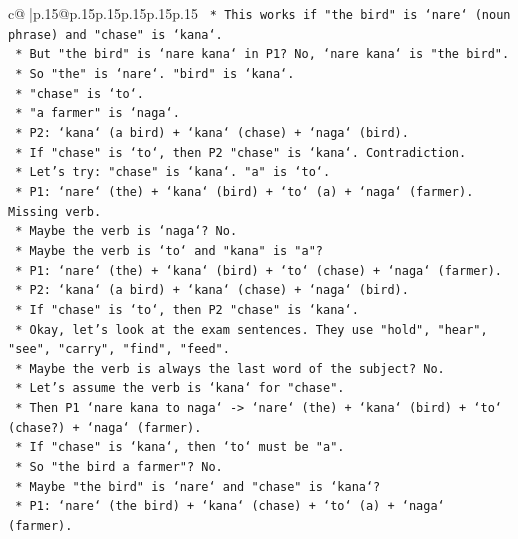 \documentclass{article}
\begin{document}
{\begin{supertabular}{c@{$\;$}|p{.15\linewidth}@{}p{.15\linewidth}p{.15\linewidth}p{.15\linewidth}p{.15\linewidth}p{.15\linewidth}}
{{{\texttt{            *   This works if "the bird" is `nare` (noun phrase) and "chase" is `kana`.} \\
\texttt{            *   But "the bird" is `nare kana` in P1? No, `nare kana` is "the bird".} \\
\texttt{            *   So "the" is `nare`. "bird" is `kana`.} \\
\texttt{            *   "chase" is `to`.} \\
\texttt{            *   "a farmer" is `naga`.} \\
\texttt{            *   P2: `kana` (a bird) + `kana` (chase) + `naga` (bird).} \\
\texttt{            *   If "chase" is `to`, then P2 "chase" is `kana`. Contradiction.} \\
\texttt{            *   Let's try: "chase" is `kana`. "a" is `to`.} \\
\texttt{            *   P1: `nare` (the) + `kana` (bird) + `to` (a) + `naga` (farmer). Missing verb.} \\
\texttt{            *   Maybe the verb is `naga`? No.} \\
\texttt{            *   Maybe the verb is `to` and "kana" is "a"?} \\
\texttt{            *   P1: `nare` (the) + `kana` (bird) + `to` (chase) + `naga` (farmer).} \\
\texttt{            *   P2: `kana` (a bird) + `kana` (chase) + `naga` (bird).} \\
\texttt{            *   If "chase" is `to`, then P2 "chase" is `kana`.} \\
\texttt{            *   Okay, let's look at the exam sentences. They use "hold", "hear", "see", "carry", "find", "feed".} \\
\texttt{            *   Maybe the verb is always the last word of the subject? No.} \\
\texttt{            *   Let's assume the verb is `kana` for "chase".} \\
\texttt{            *   Then P1 `nare kana to naga` {-}> `nare` (the) + `kana` (bird) + `to` (chase?) + `naga` (farmer).} \\
\texttt{            *   If "chase" is `kana`, then `to` must be "a".} \\
\texttt{            *   So "the bird a farmer"? No.} \\
\texttt{            *   Maybe "the bird" is `nare` and "chase" is `kana`?} \\
\texttt{            *   P1: `nare` (the bird) + `kana` (chase) + `to` (a) + `naga` (farmer).} \\
}}}
\end{supertabular}}
\end{document}
